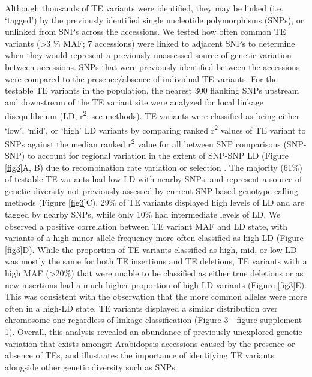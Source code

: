\documentclass[12pt]{article}
\begin{document}
Although thousands of TE variants were identified, they may be linked
(i.e. `tagged') by the previously identified single nucleotide
polymorphisms (SNPs), or unlinked from SNPs across the accessions. We
tested how often common TE variants (\textgreater{}3 \% MAF; 7
accessions) were linked to adjacent SNPs to determine when they would
represent a previously unassessed source of genetic variation between
accessions. SNPs that were previously identified between the
accessions \cite{Schmitz:2013iu} were compared to the presence/absence
of individual TE variants. For the testable TE variants in the
population, the nearest 300 flanking SNPs upstream and downstream of
the TE variant site were analyzed for local linkage disequilibrium
(LD, r\textsuperscript{2}; see methods). TE variants were classified
as being either `low', `mid', or `high' LD variants by comparing
ranked r\textsuperscript{2} values of TE variant to SNPs against the
median ranked r\textsuperscript{2} value for all between SNP
comparisons (SNP-SNP) to account for regional variation in the extent
of SNP-SNP LD (Figure \ref{fig3}A, B) due to recombination rate
variation or selection \cite{Horton:2012jh}. The majority (61\%) of
testable TE variants had low LD with nearby SNPs, and represent a
source of genetic diversity not previously assessed by current
SNP-based genotype calling methods (Figure \ref{fig3}C). 29\% of TE
variants displayed high levels of LD and are tagged by nearby SNPs,
while only 10\% had intermediate levels of LD. We observed a positive
correlation between TE variant MAF and LD state, with variants of a
high minor allele frequency more often classified as high-LD (Figure
\ref{fig3}D). While the proportion of TE variants classified as high,
mid, or low-LD was mostly the same for both TE insertions and TE
deletions, TE variants with a high MAF (\textgreater{}20\%) that were
unable to be classified as either true deletions or as new insertions
had a much higher proportion of high-LD variants (Figure
\ref{fig3}E). This was consistent with the observation that the more
common alleles were more often in a high-LD state. TE variants
displayed a similar distribution over chromosome one regardless of
linkage classification (Figure 3 - figure supplement
\hyperref[fig3s1]{1}). Overall, this analysis revealed an abundance of
previously unexplored genetic variation that exists amongst
Arabidopsis accessions caused by the presence or absence of TEs, and
illustrates the importance of identifying TE variants alongside other
genetic diversity such as SNPs.
\end{document}
